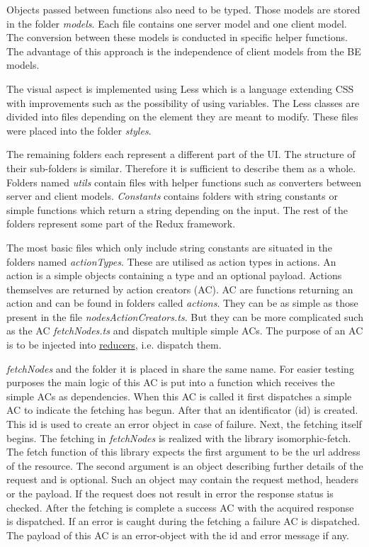 Objects passed between functions also need to be typed. Those models are stored in the folder \textit{models}. Each file contains one server model and one client model. The conversion between these models is conducted in specific helper functions. The advantage of this approach is the independence of client models from the BE models.

The visual aspect is implemented using Less \cite{less} which is a language extending CSS with improvements such as the possibility of using variables. The Less classes are divided into files depending on the element they are meant to modify. These files were placed into the folder \textit{styles}. 

The remaining folders each represent a different part of the UI. The structure of their sub-folders is similar. Therefore it is sufficient to describe them as a whole. Folders named \textit{utils} contain files with helper functions such as converters between server and client models. \textit{Constants} contains folders with string constants or simple functions which return a string depending on the input. The rest of the folders represent some part of the Redux framework. 

The most basic files which only include string constants are situated in the folders named \textit{actionTypes}.  These are utilised as action types in actions. An action is a simple objects containing a type and an optional payload. Actions themselves are returned by action creators (AC). AC are functions returning an action and can be found in folders called \textit{actions}. They can be as simple as those present in the file \textit{nodesActionCreators.ts}. But they can be more complicated such as the AC \textit{fetchNodes.ts} and dispatch multiple simple ACs. The purpose of an AC is to be injected into \hyperlink{reducers}{reducers}, i.e. dispatch them.

\textit{fetchNodes} and the folder it is placed in share the same name. For easier testing purposes the main logic of this AC is put into a function which receives the simple ACs as dependencies. When this AC is called it first dispatches a simple AC to indicate the fetching has begun. After that an identificator (id) is created. This id is used to create an error object in case of failure. Next, the fetching itself begins. The fetching in \textit{fetchNodes} is realized with the library isomorphic-fetch. The fetch function of this library expects the first argument to be the url address of the resource. The second argument is an object describing further details of the request and is optional. Such an object may contain the request method, headers or the payload. If the request does not result in error the response status is checked. After the fetching is complete a success AC with the acquired response is dispatched. If an error is caught during the fetching a failure AC is dispatched. The payload of this AC is an error-object with the id and error message if any.


